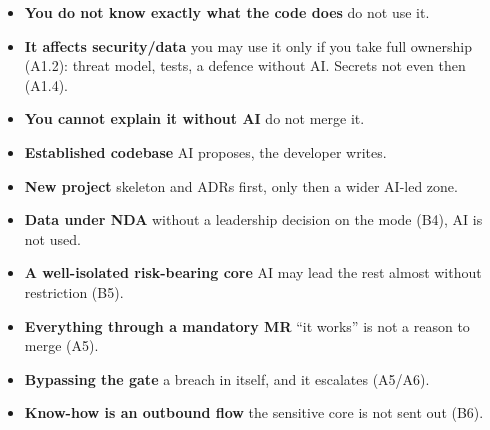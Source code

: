 \begin{itemize}
\item \textbf{You do not know exactly what the code does} \then{} do not use it.
\item \textbf{It affects security/data} \then{} you may use it only if you take full ownership (A1.2): threat model, tests, a defence without AI. Secrets not even then (A1.4).
\item \textbf{You cannot explain it without AI} \then{} do not merge it.
\item \textbf{Established codebase} \then{} AI proposes, the developer writes.
\item \textbf{New project} \then{} skeleton and ADRs first, only then a wider AI-led zone.
\item \textbf{Data under NDA} \then{} without a leadership decision on the mode (B4), AI is not used.
\item \textbf{A well-isolated risk-bearing core} \then{} AI may lead the rest almost without restriction (B5).
\item \textbf{Everything through a mandatory MR} \then{} \enquote{it works} is not a reason to merge (A5).
\item \textbf{Bypassing the gate} \then{} a breach in itself, and it escalates (A5/A6).
\item \textbf{Know-how is an outbound flow} \then{} the sensitive core is not sent out (B6).
\end{itemize}


